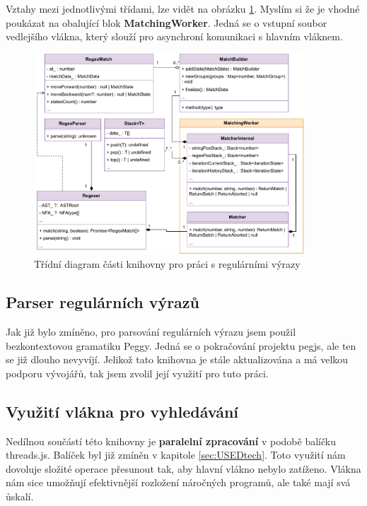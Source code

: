 
Vztahy mezi jednotlivými třídami, lze vidět na obrázku \ref{fig:ARCH_RGXR}. 
Myslím si že je vhodné poukázat na obalující blok \textbf{MatchingWorker}.
Jedná se o vstupní soubor vedlejšího vlákna, který slouží pro asynchroní komunikaci s hlavním vláknem.



\begin{figure}[!h]
	\centering
	\includegraphics[width=0.9\textwidth]{Figures/UML_RGXR.pdf}
	\caption{Třídní diagram části knihovny pro práci s regulárními výrazy}
	\label{fig:ARCH_RGXR}
\end{figure}


\subsection*{Parser regulárních výrazů}

Jak již bylo zmíněno, pro parsování regulárních výrazu jsem použil bezkontextovou gramatiku Peggy.
Jedná se o pokračování projektu pegjs, ale ten se již dlouho nevyvíjí. 
Jelikož tato knihovna je stále aktualizována a má velkou podporu vývojářů, tak jsem zvolil její využití pro tuto práci.

\subsection*{Využití vlákna pro vyhledávání}
Nedílnou součástí této knihovny je \textbf{paralelní zpracování} v podobě balíčku threads.js.
Balíček byl již zmíněn v kapitole \ref{sec:USEDtech}.
Toto využití nám dovoluje složité operace přesunout tak, aby hlavní vlákno nebylo zatíženo.
Vlákna nám sice umožňují efektivnější rozložení náročných programů, ale také mají svá ůskalí.

